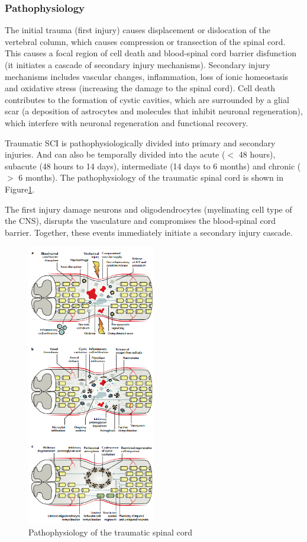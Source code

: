 \documentclass[12pt,article,oneside,a4paper]{memoir}
\begin{document}
\subsubsection{Pathophysiology}
The initial trauma (first injury) causes displacement or dislocation of the vertebral column, which causes compression or transection of the spinal cord. This causes a focal region of cell death and blood-spinal cord barrier disfunction (it initiates a cascade of secondary injury mechanisms). Secondary injury mechanisms includes vascular changes, inflammation, loss of ionic homeostasis and oxidative stress (increasing the damage to the spinal cord). Cell death contributes to the formation of cystic cavities, which are surrounded by a glial scar (a deposition of astrocytes and molecules that inhibit neuronal regeneration), which interfere with neuronal regeneration and functional recovery.

Traumatic SCI is pathophysiologically divided into primary and secondary injuries. And can also be temporally divided into the acute ($<$ 48 hours), subacute (48 hours to 14 days), intermediate (14 days to 6 months) and chronic ($>$ 6 months). The pathophysiology of the traumatic spinal cord is shown in Figure\ref{fig:SCI-pathophysiology}.

The first injury damage neurons and oligodendrocytes (myelinating cell type of the CNS), disrupts the vasculature and compromises the blood-spinal cord barrier. Together, these events immediately initiate a secondary injury cascade.

\begin{figure}
  \centering
  \includegraphics[width=0.5\textwidth]{imgs/SCI-timeline.png}
  \caption{Pathophysiology of the traumatic spinal cord}
  \label{fig:SCI-pathophysiology}
\end{figure}
\end{document}
